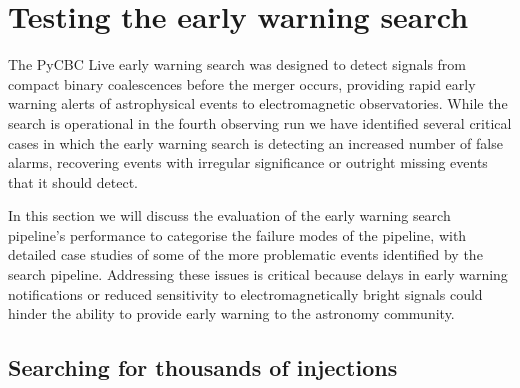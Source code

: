 \section{\label{6:sec:injection-tests}Testing the early warning search}

The PyCBC Live early warning search was designed to detect \gwadj signals from compact binary coalescences before the merger occurs, providing rapid early warning alerts of astrophysical events to electromagnetic observatories. While the search is operational in the fourth observing run we have identified several critical cases in which the early warning search is detecting an increased number of false alarms, recovering events with irregular significance or outright missing events that it should detect.

In this section we will discuss the evaluation of the early warning search pipeline's performance to categorise the failure modes of the pipeline, with detailed case studies of some of the more problematic events identified by the search pipeline. Addressing these issues is critical because delays in early warning notifications or reduced sensitivity to electromagnetically bright signals could hinder the ability to provide early warning to the astronomy community.

\subsection{\label{6:sec:injection-set}Searching for thousands of \gwadj injections}

